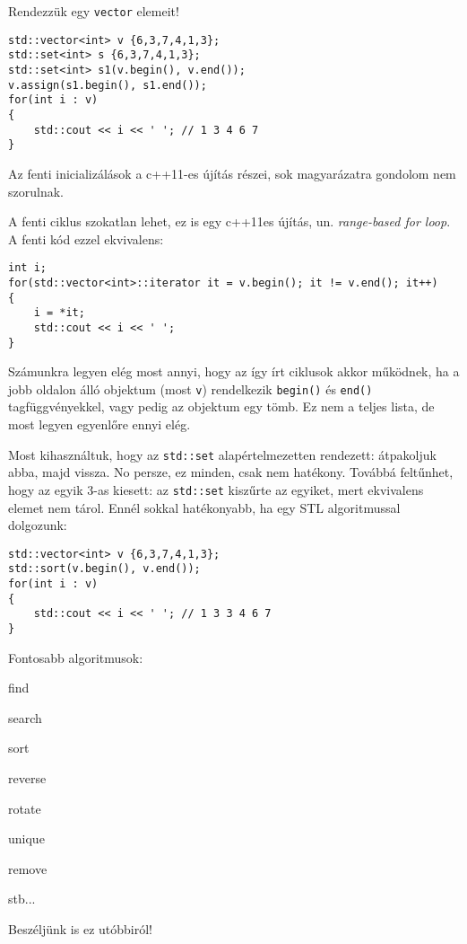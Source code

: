 \documentclass[a4paper,11.5pt]{article}
\begin{document}
	\medskip
	Rendezzük egy \texttt{vector} elemeit!
	\begin{lstlisting}
std::vector<int> v {6,3,7,4,1,3};
std::set<int> s {6,3,7,4,1,3};
std::set<int> s1(v.begin(), v.end());
v.assign(s1.begin(), s1.end());
for(int i : v)
{
	std::cout << i << ' '; // 1 3 4 6 7 
}
	\end{lstlisting}
	\begin{note}
		Az fenti inicializálások a c++11-es újítás részei, sok magyarázatra gondolom nem szorulnak.
		
		A fenti ciklus szokatlan lehet, ez is egy c++11es újítás, un. \textit{range-based for loop}. A fenti kód ezzel ekvivalens:
		\begin{lstlisting}
int i;
for(std::vector<int>::iterator it = v.begin(); it != v.end(); it++)
{
	i = *it;
	std::cout << i << ' ';
}
		\end{lstlisting}
		Számunkra legyen elég most annyi, hogy az így írt ciklusok akkor működnek, ha a jobb oldalon álló objektum (most \texttt{v}) rendelkezik \texttt{begin()} és \texttt{end()} tagfüggvényekkel, vagy pedig az objektum egy tömb. Ez nem a teljes lista, de most legyen egyenlőre ennyi elég.
	\end{note}
	Most kihasználtuk, hogy az \texttt{std::set} alapértelmezetten rendezett: átpakoljuk abba, majd vissza. No persze, ez minden, csak nem hatékony. Továbbá feltűnhet, hogy az egyik 3-as kiesett: az \texttt{std::set} kiszűrte az egyiket, mert ekvivalens elemet nem tárol. Ennél sokkal hatékonyabb, ha egy STL algoritmussal dolgozunk:
	\begin{lstlisting}
std::vector<int> v {6,3,7,4,1,3};
std::sort(v.begin(), v.end());
for(int i : v)
{
	std::cout << i << ' '; // 1 3 3 4 6 7 
}
	\end{lstlisting}
	Fontosabb algoritmusok:
	\begin{compactitem}
		\item find
		\item search
		\item sort
		\item reverse
		\item rotate
		\item unique
		\item remove
		\item stb...
	\end{compactitem}
	Beszéljünk is ez utóbbiról!
	
\end{document}
